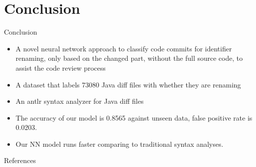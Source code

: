 \documentclass[xcolor=svgnames]{beamer}
\begin{document}
\section{Conclusion}
\begin{frame}{Conclusion}
\begin{itemize}
\item A novel neural network approach to classify code commits for identifier renaming,
only based on the changed part, without the full source code,
to assist the code review process
\item A dataset that labels \num{73080} Java diff files with whether they are renaming
\item An {\sc antlr} syntax analyzer for Java diff files
\item The accuracy of our model is 0.8565 against unseen data, false positive rate is 0.0203.
\item Our NN model runs faster comparing to traditional syntax analyses.
\end{itemize}

\end{frame}



\begin{frame}[t,allowframebreaks]{References}
	
	
\end{frame}

%
\end{document}
